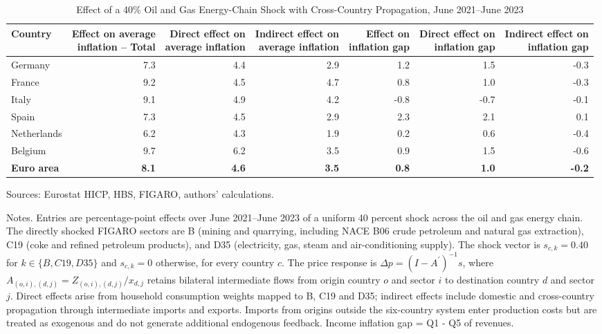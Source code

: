 \begin{table}[H]
\centering
\caption{Effect of a 40\% Oil and Gas Energy-Chain Shock with Cross-Country Propagation, June 2021--June 2023}
\scriptsize
\setlength{\tabcolsep}{4.2pt}
\begin{tabular}{lrrrrrr}
\toprule
Country & \shortstack{Effect on average\\inflation -- Total} & \shortstack{Direct effect on\\average inflation} & \shortstack{Indirect effect on\\average inflation} & \shortstack{Effect on\\inflation gap} & \shortstack{Direct effect on\\inflation gap} & \shortstack{Indirect effect on\\inflation gap}
 \\
\midrule
Germany & 7.3 & 4.4 & 2.9 & 1.2 & 1.5 & -0.3
 \\
France & 9.2 & 4.5 & 4.7 & 0.8 & 1.0 & -0.3
 \\
Italy & 9.1 & 4.9 & 4.2 & -0.8 & -0.7 & -0.1
 \\
Spain & 7.3 & 4.5 & 2.9 & 2.3 & 2.1 & 0.1
 \\
Netherlands & 6.2 & 4.3 & 1.9 & 0.2 & 0.6 & -0.4
 \\
Belgium & 9.7 & 6.2 & 3.5 & 0.9 & 1.5 & -0.6
 \\
\midrule
\textbf{Euro area} & \textbf{8.1} & \textbf{4.6} & \textbf{3.5} & \textbf{0.8} & \textbf{1.0} & \textbf{-0.2}
 \\
\bottomrule
\end{tabular}
\par\vspace{0.35em}\footnotesize\noindent Sources: Eurostat HICP, HBS, FIGARO, authors' calculations.
\par\vspace{0.25em}\footnotesize\noindent Notes. Entries are percentage-point effects over June 2021--June 2023 of a uniform 40 percent shock across the oil and gas energy chain. The directly shocked FIGARO sectors are B (mining and quarrying, including NACE B06 crude petroleum and natural gas extraction), C19 (coke and refined petroleum products), and D35 (electricity, gas, steam and air-conditioning supply). The shock vector is $s_{c,k}=0.40$ for $k\in\{B,C19,D35\}$ and $s_{c,k}=0$ otherwise, for every country $c$. The price response is $\Delta p = (I - A^{\prime})^{-1}s$, where $A_{(o,i),(d,j)}=Z_{(o,i),(d,j)}/x_{d,j}$ retains bilateral intermediate flows from origin country $o$ and sector $i$ to destination country $d$ and sector $j$. Direct effects arise from household consumption weights mapped to B, C19 and D35; indirect effects include domestic and cross-country propagation through intermediate imports and exports. Imports from origins outside the six-country system enter production costs but are treated as exogenous and do not generate additional endogenous feedback. Income inflation gap = Q1 - Q5 of revenues.
\end{table}
\vspace{0.6em}
